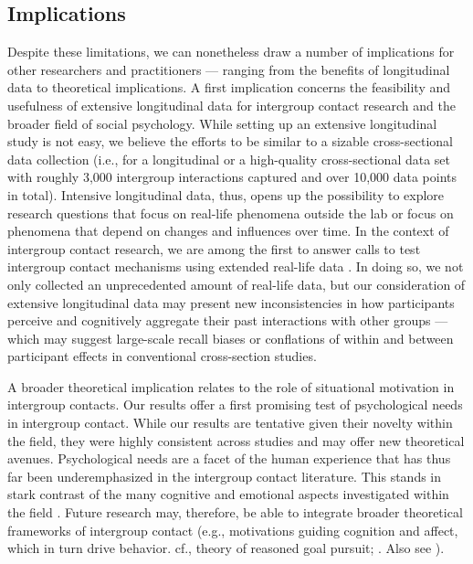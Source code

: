 \documentclass[man, 12pt, a4paper, mask]{apa7}
\theoremstyle{break}
\theoremstyle{plain}
\providecommand{\DIFaddbegin}{} %
\providecommand{\DIFaddend}{} %
\providecommand{\DIFdelbegin}{} %
\providecommand{\DIFdelend}{} %
\newcommand{\DIFscaledelfig}{0.5}
\newlength{\DIFdelgraphicswidth} %
\newlength{\DIFdelgraphicsheight} %
\newcommand{\DIFaddincludegraphics}[2][]{{\color{blue}\fbox{\DIFOincludegraphics[#1]{#2}}}} %
\newcommand{\DIFdelincludegraphics}[2][]{%
\sbox{\DIFdelgraphicsbox}{\DIFOincludegraphics[#1]{#2}}%
\settoboxwidth{\DIFdelgraphicswidth}{\DIFdelgraphicsbox} %
\settoboxtotalheight{\DIFdelgraphicsheight}{\DIFdelgraphicsbox} %
\scalebox{\DIFscaledelfig}{%
\parbox[b]{\DIFdelgraphicswidth}{\usebox{\DIFdelgraphicsbox}\\[-\baselineskip] \rule{\DIFdelgraphicswidth}{0em}}\llap{\resizebox{\DIFdelgraphicswidth}{\DIFdelgraphicsheight}{%
\setlength{\unitlength}{\DIFdelgraphicswidth}%
\begin{picture}(1,1)%
\thicklines\linethickness{2pt} %
{\color[rgb]{1,0,0}\put(0,0){\framebox(1,1){}}}%
{\color[rgb]{1,0,0}\put(0,0){\line( 1,1){1}}}%
{\color[rgb]{1,0,0}\put(0,1){\line(1,-1){1}}}%
\end{picture}%
}\hspace*{3pt}}} %
} %
\DeclareRobustCommand{\DIFaddbegin}{\DIFOaddbegin \let\includegraphics\DIFaddincludegraphics} %
\DeclareRobustCommand{\DIFaddend}{\DIFOaddend \let\includegraphics\DIFOincludegraphics} %
\DeclareRobustCommand{\DIFdelbegin}{\DIFOdelbegin \let\includegraphics\DIFdelincludegraphics} %
\DeclareRobustCommand{\DIFdelend}{\DIFOaddend \let\includegraphics\DIFOincludegraphics} %
\begin{document}
\subsection{Implications}
Despite these limitations, we can nonetheless draw a number of implications for other researchers and practitioners --- ranging from the benefits of longitudinal data to theoretical implications. A first implication concerns the feasibility and usefulness of extensive longitudinal data for intergroup contact research and the broader field of social psychology. While setting up an extensive longitudinal study is not easy, we believe the efforts to be similar to a sizable cross-sectional data collection (i.e., for a longitudinal or a high-quality cross-sectional data set with roughly 3,000 intergroup interactions captured and over 10,000 data points in total). Intensive longitudinal data, thus, opens up the possibility to explore research questions that focus on real-life phenomena outside the lab or focus on phenomena that depend on changes and influences over time. In the context of intergroup contact research, we are among the first to answer calls to test intergroup contact mechanisms using extended real-life data \citep[e.g.,][]{Pettigrew2011, MacInnis2015}. In doing so, we not only collected an unprecedented amount of real-life data, but our consideration of extensive longitudinal data may present new inconsistencies in how participants perceive and cognitively aggregate their past interactions with other groups — which may suggest large-scale recall biases or conflations of within and between participant effects in conventional cross-section studies.

A broader theoretical implication relates to the role of situational motivation in intergroup contacts. Our results offer a first promising test of psychological needs in intergroup contact. While our results are tentative given their novelty within the field, they were highly consistent across studies and may offer new theoretical avenues. Psychological needs are a facet of the human experience that has thus far been underemphasized in the intergroup contact literature. This stands in stark contrast of the many cognitive \citep[e.g.,][]{Pettigrew1998, Brown2005} and emotional aspects investigated within the field \DIFdelbegin %
\DIFdelend \DIFaddbegin \citep[e.g.,][]{Stephan2008}\DIFaddend . Future research may, therefore, be able to integrate broader theoretical frameworks of intergroup contact (e.g., motivations guiding cognition and affect, which in turn drive behavior. cf., theory of reasoned goal pursuit; \citealp{Ajzen2019}. Also see \citealp{Kreienkamp2022d}). 
\end{document}
